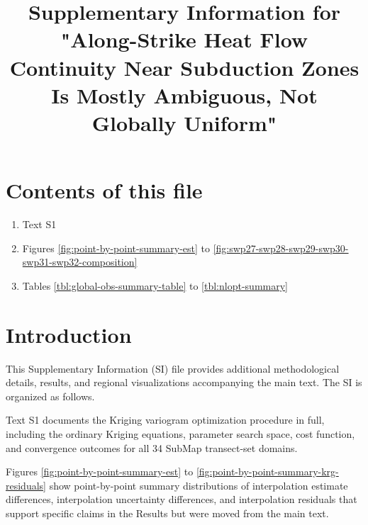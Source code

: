 \documentclass[final]{agujournal2019}
\providecommand{\tightlist}{\setlength{\itemsep}{0pt}\setlength{\parskip}{0pt}}
\let\oldtitle\title
\renewcommand{\title}[1]{\oldtitle{#1}\thispagestyle{front}}
\begin{document}
\title{Supplementary Information for "Along-Strike Heat Flow Continuity
Near Subduction Zones Is Mostly Ambiguous, Not Globally Uniform"}




\section*{Contents of this file}\label{sec:contents}

\begin{enumerate}
\def\labelenumi{\arabic{enumi}.}
\tightlist
\item
  Text S1
\item
  Figures \ref{fig:point-by-point-summary-est} to
  \ref{fig:swp27-swp28-swp29-swp30-swp31-swp32-composition}
\item
  Tables \ref{tbl:global-obs-summary-table} to \ref{tbl:nlopt-summary}
\end{enumerate}

\clearpage

\section*{Introduction}\label{sec:introduction}

This Supplementary Information (SI) file provides additional
methodological details, results, and regional visualizations
accompanying the main text. The SI is organized as follows.

Text S1 documents the Kriging variogram optimization procedure in full,
including the ordinary Kriging equations, parameter search space, cost
function, and convergence outcomes for all 34 SubMap transect-set
domains.

Figures \ref{fig:point-by-point-summary-est} to
\ref{fig:point-by-point-summary-krg-residuals} show point-by-point
summary distributions of interpolation estimate differences,
interpolation uncertainty differences, and interpolation residuals that
support specific claims in the Results but were moved from the main
text.
\end{document}
